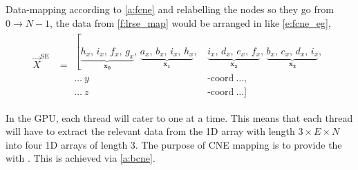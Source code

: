 	Data-mapping according to \cref{a:fcne} and relabelling the nodes so they go from $ 0 \to N-1 $, the data from \cref{f:lrse_map} would be arranged in  like \cref{e:fcne_eg},
	\begin{align}\label{e:fcne_eg}
		\vec{X}^{\textrm{SE}} &= \begin{aligned}
			\left[\underbrace{h_{x},\, i_{x},\, f_{x},\, g_{x}}_{\mathbf{x_{0}}},\, 
			\underbrace{a_{x},\, b_{x},\, i_{x},\, h_{x}}_{\mathbf{x_{1}}},\, 
			\right.&\underbrace{i_{x},\, d_{x},\, e_{x},\, f_{x}}_{\mathbf{x_{2}}},\, 
			\underbrace{b_{x},\, c_{x},\, d_{x},\, i_{x}}_{\mathbf{x_{3}}},\\
			\ldots~y&\textrm{-coord}~\ldots,\\
			\ldots~z&\textrm{-coord}~\ldots]
		\end{aligned}
	\end{align}
	
	In the GPU, each thread will cater to one  at a time. This means that each thread will have to extract the relevant data from the 1D array with length $ 3\times E\times N $ into four 1D arrays of length $ 3 $. The purpose of CNE mapping is to provide the  with . This is achieved via \cref{a:bcne}.
	
